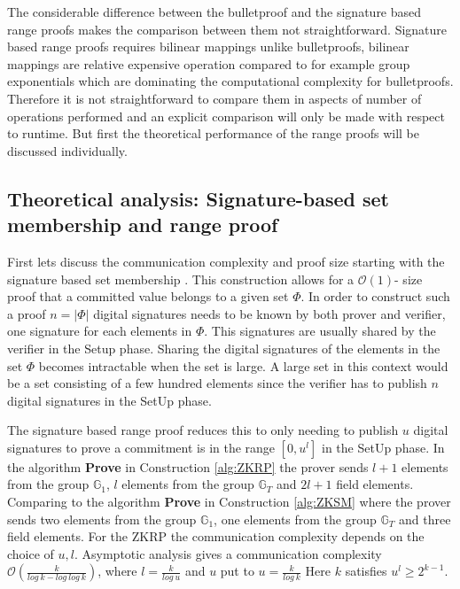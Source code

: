 The considerable difference between the bulletproof and the signature based range proofs makes the comparison between them not straightforward.  Signature based range proofs requires bilinear mappings unlike bulletproofs, bilinear mappings are relative expensive operation compared to for example group exponentials which are dominating  the computational complexity for bulletproofs. Therefore it is not straightforward to compare them in aspects of number of operations performed and an explicit comparison will only be made with respect to runtime. But first the theoretical performance of the range proofs will be discussed individually.

\subsection{Theoretical analysis: Signature-based set membership and range proof}

First lets discuss the communication complexity and proof size starting with the signature based set membership . This construction allows for a $\mathcal{O}(1)$- size proof that a committed value belongs to a given set $\Phi$. In order to construct such a proof $n=|\Phi|$ digital signatures needs to be known by both prover and verifier, one signature for each elements in $\Phi$. This signatures are usually shared by the verifier in the Setup phase. Sharing the digital signatures of the elements in the set $\Phi$ becomes intractable when the set is large.  A large set in this context would be a set consisting of a few hundred elements since the verifier has to publish $n$ digital signatures in the SetUp phase. 

The signature based range proof reduces this to only needing to publish $u$ digital signatures to prove a commitment is in the range $[0,u^l]$ in the SetUp phase. In the algorithm \textbf{Prove} in Construction \ref{alg:ZKRP} the prover sends $l+1$ elements from the group $\mathds{G}_1$, $l$ elements from the group $\mathds{G}_T$ and $2l+1$ field elements. Comparing to the algorithm \textbf{Prove} in Construction \ref{alg:ZKSM} where the prover sends two elements from the group $\mathds{G}_1$, one elements from the group $\mathds{G}_T$ and three field elements. For the ZKRP the communication complexity depends on the choice of $u,l$. Asymptotic analysis gives a communication complexity $\mathcal{O}(\frac{k}{log\:k-log\:log\:k})$, where $l=\frac{k}{log\:u}$ and $u$ put to $u=\frac{k}{log\: k}$ Here $k$ satisfies $u^l \geq 2^{k-1}$.


